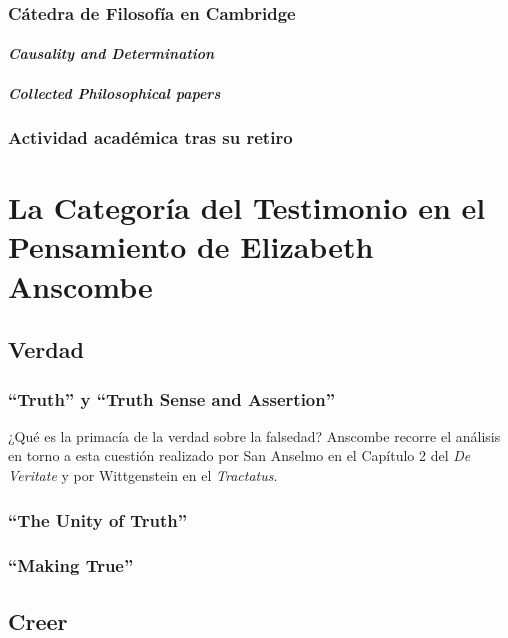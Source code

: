 \documentclass[./main.tex]{subfiles}
\begin{document}
\subsection{Cátedra de Filosofía en Cambridge}

\subsubsection{\emph{Causality and Determination}}

\subsubsection{\emph{Collected Philosophical papers}}

\subsection{Actividad académica tras su retiro}

\setcounter{chapter}{3}
\chapter{
La Categoría del Testimonio en el Pensamiento de Elizabeth Anscombe
}

\section{Verdad}

\subsection{``Truth'' y ``Truth Sense and Assertion''}

¿Qué es la primacía de la verdad sobre la falsedad? Anscombe recorre el análisis
en torno a esta cuestión realizado por San Anselmo en el Capítulo 2 del \emph{De
  Veritate} y por Wittgenstein en el \emph{Tractatus}.

\subsection{``The Unity of Truth''}

\subsection{``Making True''}

\section{Creer}
\end{document}
